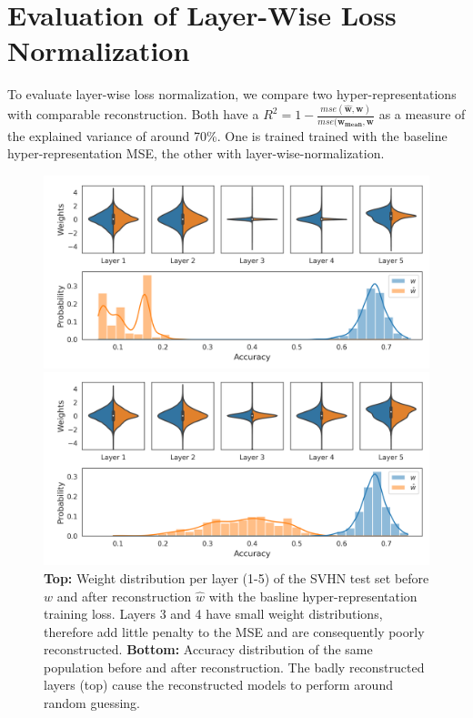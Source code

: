 \newpage
\section{Evaluation of Layer-Wise Loss Normalization }
\label{app:loss}
To evaluate layer-wise loss normalization, we compare two hyper-representations with comparable reconstruction. Both have a $R^2=1-\frac{mse(\hat{\mathbf{w}},\mathbf{w})}{mse(\mathbf{w_{mean},\mathbf{w}}}$ as a measure of the explained variance of around 70\%. One is trained trained with the baseline hyper-representation MSE, the other with layer-wise-normalization. 
\begin{figure}[ht!]
\begin{minipage}[t]{1.0\textwidth}
\begin{center}
\includegraphics[trim=0in 0in 0in 0in, width=0.8\linewidth]{figures/weight_distribution_accuracy_recon_raw.png}
\vskip -0.1in
\caption{
\textbf{Top:} Weight distribution per layer (1-5) of the SVHN test set before $w$ and after reconstruction $\hat{w}$ with the basline hyper-representation training loss. 
Layers 3 and 4 have small weight distributions, therefore add little penalty to the MSE and are consequently poorly reconstructed. 
\textbf{Bottom:} Accuracy distribution of the same population before and after reconstruction. 
The badly reconstructed layers (top) cause the reconstructed models to perform around random guessing.
}
\label{fig:weight_distro_raw}    
\end{center}
\end{minipage}
\vspace{2mm}
\begin{minipage}[t]{1.0\textwidth}
\begin{center}
\includegraphics[trim=0in 0in 0in 0in, width=0.8\linewidth]{figures/weight_distribution_accuracy_recon_norm.png}

\end{center}
\end{minipage}
\end{figure}
